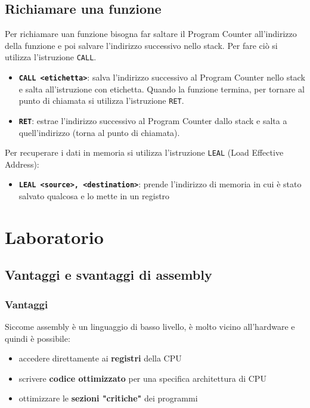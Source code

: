\documentclass[a4paper]{article}
\theoremstyle{break}
\theoremstyle{break}
\theoremstyle{break}
\theoremstyle{break}
\begin{document}
\subsection{Richiamare una funzione}
Per richiamare uan funzione bisogna far saltare il Program Counter all'indirizzo della funzione
e poi salvare l'indirizzo successivo nello stack. Per fare ciò si utilizza l'istruzione \texttt{CALL}.
\begin{itemize}
	\item \textbf{\texttt{CALL <etichetta>}}: salva l'indirizzo successivo al Program Counter nello stack e salta all'istruzione con etichetta.
	      Quando la funzione termina, per tornare al punto di chiamata si utilizza l'istruzione \texttt{RET}.
	\item \textbf{\texttt{RET}}: estrae l'indirizzo successivo al Program Counter dallo stack e salta a quell'indirizzo (torna al punto di chiamata).
\end{itemize}

Per recuperare i dati in memoria si utilizza l'istruzione \texttt{LEAL} (Load Effective Address):
\begin{itemize}
	\item \textbf{\texttt{LEAL <source>, <destination>}}: prende l'indirizzo di memoria in cui è stato salvato qualcosa
	      e lo mette in un registro
\end{itemize}

\section{Laboratorio}
\subsection{Vantaggi e svantaggi di assembly}
\subsubsection{Vantaggi}
Siccome assembly è un linguaggio di basso livello, è molto vicino all'hardware e quindi è possibile:
\begin{itemize}
	\item accedere direttamente ai \textbf{registri} della CPU
	\item scrivere \textbf{codice ottimizzato} per una specifica architettura di CPU
	\item ottimizzare le \textbf{sezioni "critiche"} dei programmi
\end{itemize}
\end{document}
